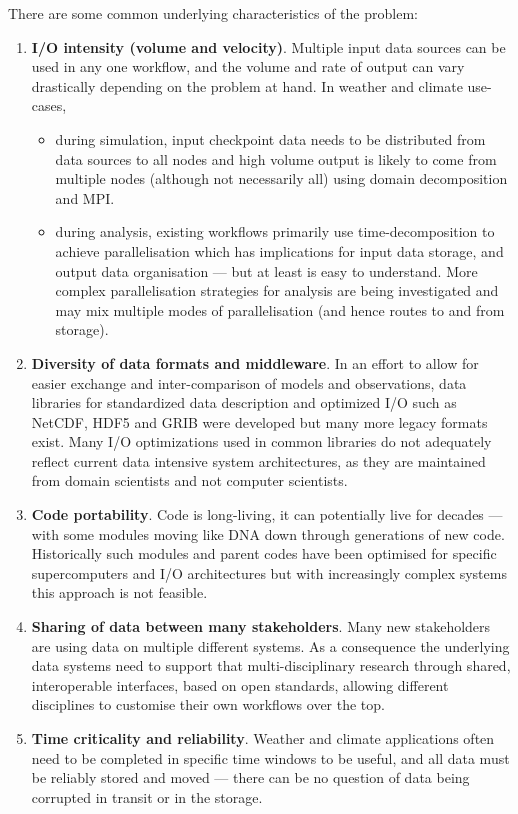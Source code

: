 There are some common underlying characteristics of the problem:
\begin{enumerate}
\item \textbf{I/O intensity (volume and velocity)}.
Multiple input data sources can be used in any one workflow, and the volume and rate of output can vary drastically depending on the problem at hand. In weather and climate use-cases,
\begin{itemize}
\item during simulation, input checkpoint data needs to be distributed from data sources to all nodes and high volume output is likely to come from multiple nodes (although not necessarily all) using domain decomposition and MPI.
\item during analysis, existing workflows primarily use time-decomposition to achieve parallelisation which has implications for input data storage, and output data organisation --- but at least is easy to understand. More complex parallelisation strategies for analysis are being investigated and may mix multiple modes of parallelisation (and hence routes to and from storage).
\end{itemize}

\item \textbf{Diversity of data formats and middleware}.
In an effort to allow for easier exchange and inter-comparison of models and observations, data libraries for standardized data description and optimized I/O such as NetCDF, HDF5 and GRIB were developed but many more legacy formats exist.
Many I/O optimizations used in common libraries do not adequately reflect current data intensive system architectures, as they are maintained from
domain scientists and not computer scientists.

\item \textbf{Code portability}. Code is long-living, it can potentially live
for decades --- with some modules moving like DNA down through generations of new code. Historically such modules and parent codes have been optimised for specific supercomputers  and I/O architectures but with increasingly complex systems this approach is not feasible.
\item \textbf{Sharing of data between many stakeholders}.
Many new stakeholders are using data on multiple different systems.
As a consequence the underlying data systems need to support that multi-disciplinary research through shared, interoperable interfaces, based on open standards, allowing different disciplines to customise their own workflows over the top.

\item \textbf{Time criticality and reliability}. Weather and climate applications
often need to be completed in specific time windows to be useful, and all
data must be reliably stored and moved --- there can be no question of
data being corrupted in transit or in the storage.

\end{enumerate}

